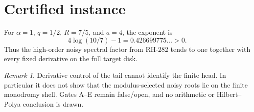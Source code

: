 \documentclass[11pt]{article}
\theoremstyle{remark}\newtheorem{remark}[theorem]{Remark}
\begin{document}
\section{Certified instance}
For $\alpha=1$, $q=1/2$, $R=7/5$, and $a=4$, the exponent is
\[
 4\log(10/7)-1=0.426699775\ldots>0.
\]
Thus the high-order noisy spectral factor from RH-282 tends to one together
with every fixed derivative on the full target disk.

\begin{remark}
Derivative control of the tail cannot identify the finite head.  In
particular it does not show that the modulus-selected noisy roots lie on the
finite monodromy shell.  Gates A--E remain false/open, and no arithmetic or
Hilbert--Polya conclusion is drawn.
\end{remark}
\end{document}
